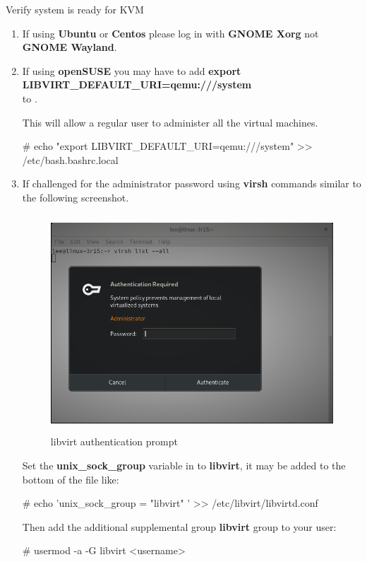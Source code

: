 \begin{Lab}
\begin{exe} {Verify system is ready for KVM }
\begin{sol}
\begin{enumerate}
         \begin{raw}
# systemctl status libvirtd
# systemctl start libvirtd
# systemctl enable libvirtd
# systemctl status libvirtd
         \end{raw}

 	\item 
	If using \textbf{Ubuntu} or \textbf{Centos} please log in 
		      with \textbf{GNOME Xorg} not \textbf{GNOME Wayland}.
	\item 
	If using \textbf{openSUSE} you may have to add 
		      \textbf{export LIBVIRT\_DEFAULT\_URI=qemu:///system} \\
		      to 
		      .  
		      
		      This will allow a regular user 
		      to administer all the virtual machines. 
		      \begin{raw}
# echo "export LIBVIRT_DEFAULT_URI=qemu:///system"  >> /etc/bash.bashrc.local
			\end{raw}
	\item 
	If challenged for the administrator password using \textbf{virsh} commands 
		      similar to the following screenshot.


\begin{figure}[H]
      \includegraphics[height=3.2in]{IMAGES/libvirt-auth.png}
      \caption{libvirt authentication prompt}
   \end{figure}



	Set the \textbf{unix\_sock\_group} variable in 
		      to \textbf{libvirt}, it may be added to the bottom of the file like:
		      \begin{raw}
# echo 'unix_sock_group = "libvirt" ' >> /etc/libvirt/libvirtd.conf
			\end{raw}
			Then add the additional supplemental group \textbf{libvirt} group to your user:
			\begin{raw}
# usermod -a -G libvirt <username> 
			\end{raw} 


\end{enumerate}
\end{sol}
\end{exe}
\end{Lab}
